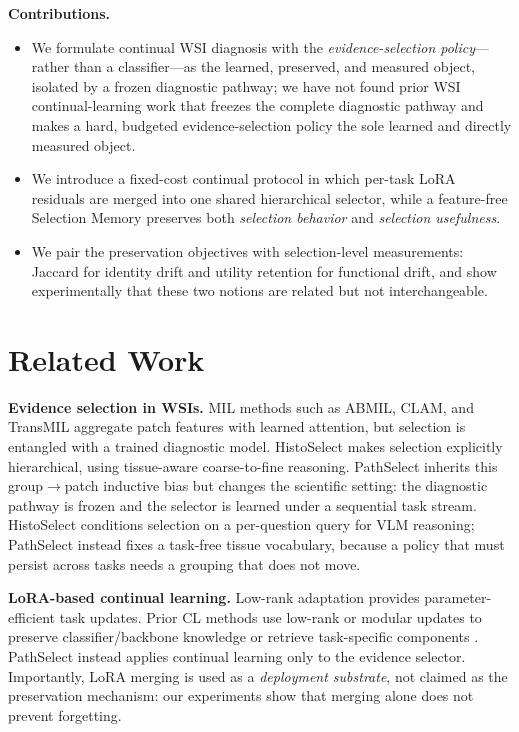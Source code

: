 \documentclass{article}
\begin{document}
\textbf{Contributions.}
\begin{itemize}
    \item We formulate continual WSI diagnosis with the \emph{evidence-selection policy}---rather than a classifier---as the learned, preserved, and measured object, isolated by a frozen diagnostic pathway; we have not found prior WSI continual-learning work that freezes the complete diagnostic pathway and makes a hard, budgeted evidence-selection policy the sole learned and directly measured object.
    \item We introduce a fixed-cost continual protocol in which per-task LoRA residuals are merged into one shared hierarchical selector, while a feature-free Selection Memory preserves both \emph{selection behavior} and \emph{selection usefulness}.
    \item We pair the preservation objectives with selection-level measurements: Jaccard for identity drift and utility retention for functional drift, and show experimentally that these two notions are related but not interchangeable.
\end{itemize}

\section{Related Work}
\label{sec:related}

\textbf{Evidence selection in WSIs.}
MIL methods such as ABMIL, CLAM, and TransMIL \cite{ilse2018abmil,lu2021clam,shao2021transmil} aggregate patch features with learned attention, but selection is entangled with a trained diagnostic model.
HistoSelect \cite{huang2026histoselect} makes selection explicitly hierarchical, using tissue-aware coarse-to-fine reasoning.
PathSelect inherits this group$\rightarrow$patch inductive bias but changes the scientific setting: the diagnostic pathway is frozen and the selector is learned under a sequential task stream. HistoSelect conditions selection on a per-question query for VLM reasoning; PathSelect instead fixes a task-free tissue vocabulary, because a policy that must persist across tasks needs a grouping that does not move.

\textbf{LoRA-based continual learning.}
Low-rank adaptation \cite{hu2022lora} provides parameter-efficient task updates.
Prior CL methods use low-rank or modular updates to preserve classifier/backbone knowledge or retrieve task-specific components \cite{liang2024inflora,wu2025sdlora,he2025cllora,chen2026flexem}.
PathSelect instead applies continual learning only to the evidence selector.
Importantly, LoRA merging is used as a \emph{deployment substrate}, not claimed as the preservation mechanism: our experiments show that merging alone does not prevent forgetting.
\end{document}
